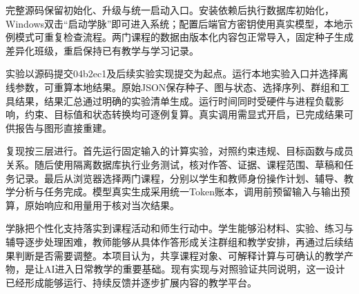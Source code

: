 \documentclass[UTF8,zihao=-4,fontset=none,a4paper]{ctexart}
\begin{document}
完整源码保留初始化、升级与统一启动入口。安装依赖后执行数据库初始化，Windows双击“启动学脉”即可进入系统；配置后端官方密钥使用真实模型，本地示例模式可重复检查流程。两门课程的数据由版本化内容包正常导入，固定种子生成差异化班级，重启保持已有教学与学习记录。

实验以源码提交04b2ec1及后续实验实现提交为起点。运行本地实验入口并选择离线参数，可重算本地结果。原始JSON保存种子、图与状态、选择序列、群组和工具结果，结果汇总通过明确的实验清单生成。运行时间同时受硬件与进程负载影响，约束、目标值和状态转换均可逐例复算。真实调用需显式开启，已完成结果可供报告与图形直接重建。

复现按三层进行。首先运行固定输入的计算实验，对照约束违规、目标函数与成员关系。随后使用隔离数据库执行业务测试，核对作答、证据、课程范围、草稿和任务记录。最后从浏览器选择两门课程，分别以学生和教师身份操作计划、辅导、教学分析与任务完成。模型真实生成采用统一Token账本，调用前预留输入与输出预算，原始响应和用量用于核对当次结果。

学脉把个性化支持落实到课程活动和师生行动中。学生能够沿材料、实验、练习与辅导逐步处理困难，教师能够从具体作答形成关注群组和教学安排，再通过后续结果判断是否需要调整。本项目认为，共享课程对象、可解释计算与可确认的教学产物，是让AI进入日常教学的重要基础。现有实现与对照验证共同说明，这一设计已经形成能够运行、持续反馈并逐步扩展内容的教学平台。

\FloatBarrier
\end{document}
